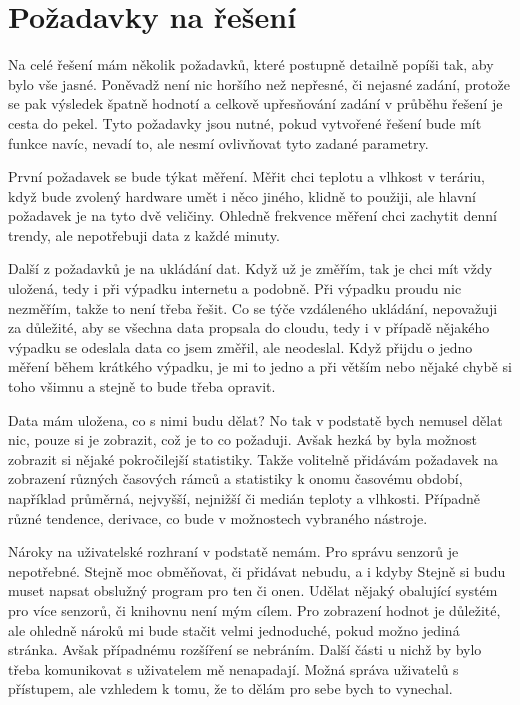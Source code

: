 \chapter{Požadavky na řešení}
Na celé řešení mám několik požadavků, které postupně detailně popíši tak, aby bylo vše jasné. Poněvadž není nic horšího 
než nepřesné, či nejasné zadání, protože se pak výsledek špatně hodnotí a celkově upřesňování zadání v průběhu řešení je 
cesta do pekel. Tyto požadavky jsou nutné, pokud vytvořené řešení bude mít funkce navíc, nevadí to, ale nesmí ovlivňovat 
tyto zadané parametry.

První požadavek se bude týkat měření. Měřit chci teplotu a vlhkost v teráriu, když bude zvolený hardware umět i něco 
jiného, klidně to použiji, ale hlavní požadavek je na tyto dvě veličiny. Ohledně frekvence měření chci zachytit denní 
trendy, ale nepotřebuji data z každé minuty.

Další z požadavků je na ukládání dat. Když už je změřím, tak je chci mít vždy uložená, tedy i při výpadku internetu 
a podobně. Při výpadku proudu nic nezměřím, takže to není třeba řešit. Co se týče vzdáleného ukládání, nepovažuji za 
důležité, aby se všechna data propsala do cloudu, tedy i v případě nějakého výpadku se odeslala data co jsem změřil, ale 
neodeslal. Když přijdu o jedno měření během krátkého výpadku, je mi to jedno a při větším nebo nějaké chybě si toho 
všimnu a stejně to bude třeba opravit.

Data mám uložena, co s nimi budu dělat? No tak v podstatě bych nemusel dělat nic, pouze si je zobrazit, což je to co 
požaduji. Avšak hezká by byla možnost zobrazit si nějaké pokročilejší statistiky. Takže volitelně přidávám požadavek na 
zobrazení různých časových rámců a statistiky k onomu časovému období, například průměrná, nejvyšší, nejnižší či medián 
teploty a vlhkosti. Případně různé tendence, derivace, co bude v možnostech vybraného nástroje.

Nároky na uživatelské rozhraní v podstatě nemám. Pro správu senzorů je nepotřebné. Stejně moc obměňovat, či přidávat 
nebudu, a i kdyby Stejně si budu muset napsat obslužný program pro ten či onen. Udělat nějaký obalující systém pro více 
senzorů, či knihovnu není mým cílem. Pro zobrazení hodnot je důležité, ale ohledně nároků mi bude stačit velmi 
jednoduché, pokud možno jediná stránka. Avšak případnému rozšíření se nebráním. Další části u nichž by bylo třeba 
komunikovat s uživatelem mě nenapadají. Možná správa uživatelů s přístupem, ale vzhledem k tomu, že to dělám pro sebe 
bych to vynechal.

